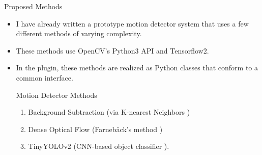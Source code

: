\documentclass[10pt]{beamer}
\begin{document}
\begin{frame}{Proposed Methods}
\begin{itemize}

\item I have already written a prototype motion detector system that uses a few different methods of varying complexity.

\item These methods use OpenCV's Python3 API and Tensorflow2.

\item In the plugin, these methods are realized as Python classes that conform to a common interface.\\[2mm]

\pause

\begin{exampleblock}{Motion Detector Methods}
\begin{enumerate}
\item Background Subtraction (via K-nearest Neighbors \cite{zivkovic_efficient_2006})\\[2mm]

\item Dense Optical Flow (Farneb\"ack's method \cite{farneback})\\[2mm]

\item TinyYOLOv2 (CNN-based object classifier \cite{YOLO}).\\[2mm]
\end{enumerate}
\end{exampleblock}
\end{itemize}
\end{frame}
\end{document}
